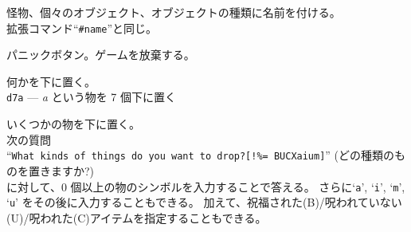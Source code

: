 怪物、個々のオブジェクト、オブジェクトの種類に名前を付ける。\\
拡張コマンド``{\tt \#name}''と同じ。
\item[\tb{\^{}C}]
パニックボタン。ゲームを放棄する。
\item[\tb{d}]
何かを下に置く。\\
{\tt d7a} --- {\it a} という物を 7 個下に置く
\item[\tb{D}]
いくつかの物を下に置く。\\
次の質問\\
``{\tt What kinds of things do you want to drop?[!\%= BUCXaium]}''
(どの種類のものを置きますか?)\\
に対して、0 個以上の物のシンボルを入力することで答える。
さらに`{\tt a}', `{\tt i}', `{\tt m}', `{\tt u}' をその後に入力することもできる。
加えて、祝福された(B)/呪われていない(U)/呪われた(C)アイテムを指定することもできる。\\
